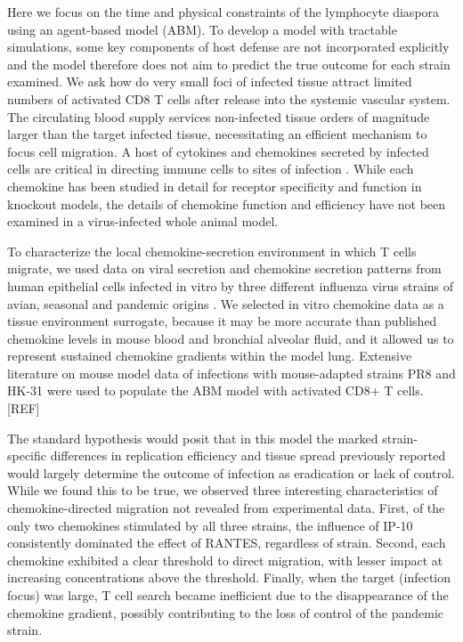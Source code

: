 \documentclass[10pt]{article}
\begin{document}
Here we focus on the time and physical constraints of the lymphocyte diaspora using an agent-based model (ABM).  To develop a model with tractable simulations, some key components of host defense are not incorporated explicitly and the model therefore does not aim to predict the true outcome for each strain examined.   We ask how do very small foci of infected tissue attract limited numbers of activated CD8 T cells after release into the systemic vascular system.  The circulating blood supply services non-infected tissue orders of magnitude larger than the target infected tissue, necessitating an efficient mechanism to focus cell migration.   A host of cytokines and chemokines secreted by infected cells are critical in directing immune cells to sites of infection \cite{Miao2010, Zhao2000, LiJeon2002}.  While each chemokine has been studied in detail for receptor specificity and function in knockout models, the details of chemokine function and efficiency have not been examined in a virus-infected whole animal model.  

To characterize the local chemokine-secretion environment in which T cells migrate, we used data on viral secretion and chemokine secretion patterns from human epithelial cells infected in vitro by three different influenza virus strains of avian, seasonal and pandemic origins \cite{Mitchell2011}.   We selected in vitro chemokine data as a tissue environment surrogate, because it may be more accurate than published chemokine levels in mouse blood and bronchial alveolar fluid, and it allowed us to represent sustained chemokine gradients within the model lung.  Extensive literature on mouse model data of infections with mouse-adapted strains PR8 and HK-31 were used to populate the ABM model with activated CD8+ T cells. [REF]

The standard hypothesis would posit that in this model the marked strain-specific differences in replication efficiency and tissue spread previously reported \cite{Mitchell2011} would largely determine the outcome of infection as eradication or lack of control.  While we found this to be true, we observed three interesting characteristics of chemokine-directed migration not revealed from experimental data.  First, of the only two chemokines stimulated by all three strains, the influence of IP-10 consistently dominated the effect of RANTES, regardless of strain.  Second, each chemokine exhibited a clear threshold to direct migration, with lesser impact at increasing concentrations above the threshold.  Finally, when the target (infection focus) was large, T cell search became inefficient due to the disappearance of the chemokine gradient, possibly contributing to the loss of control of the pandemic strain.  
\end{document}
